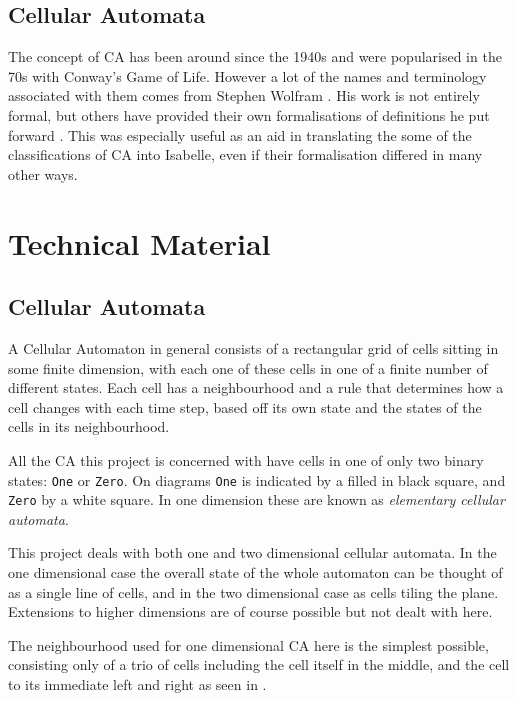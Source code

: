 \subsection{Cellular Automata}
The concept of CA has been around since the 1940s and were popularised in the 70s with Conway's Game of Life.
However a lot of the names and terminology associated with them comes from Stephen Wolfram \cite{wolfram}.
His work is not entirely formal,
but others have provided their own formalisations of definitions he put forward \cite{yu}.
This was especially useful as an aid in translating the some of the classifications of CA into Isabelle, 
even if their formalisation differed in many other ways.


\section{Technical Material}

\subsection{Cellular Automata}

A Cellular Automaton in general consists of a rectangular grid of cells sitting in some finite dimension,
with each one of these cells in one of a finite number of different states.
Each cell has a neighbourhood
and a rule that determines how a cell changes with each time step,
based off its own state and the states of the cells in its neighbourhood.

All the CA this project is concerned with have cells in one of only two binary states: \texttt{One} or \texttt{Zero}.
On diagrams \texttt{One} is indicated by a filled in black square,
and \texttt{Zero} by a white square.
In one dimension these are known as \emph{elementary cellular automata}.

This project deals with both one and two dimensional cellular automata.
In the one dimensional case the overall state of the whole automaton can be thought of as a single line of cells,
and in the two dimensional case as cells tiling the plane.
Extensions to higher dimensions are of course possible but not dealt with here.

The neighbourhood used for one dimensional CA here is the simplest possible,
consisting only of a trio of cells including the cell itself in the middle, and the cell to its immediate left and right as seen in .


